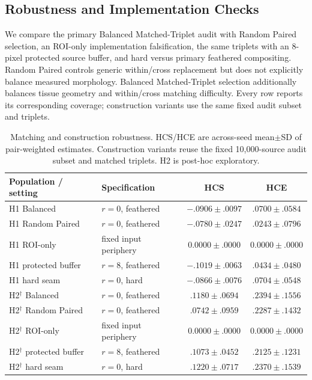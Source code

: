 \documentclass[notspecified,article,submit,moreauthors]{Definitions/mdpi}
\begin{document}
\subsection{Robustness and Implementation Checks}

We compare the primary Balanced Matched-Triplet audit with Random Paired
selection, an ROI-only implementation falsification, the same triplets with
an 8-pixel protected source buffer, and hard versus primary feathered
compositing. Random Paired controls generic within/cross replacement but
does not explicitly balance measured morphology. Balanced Matched-Triplet
selection additionally balances tissue geometry and within/cross matching
difficulty. Every row reports its corresponding coverage; construction
variants use the same fixed audit subset and triplets.

\begin{table}[H]
\caption{Matching and construction robustness. HCS/HCE are across-seed
mean$\pm$SD of pair-weighted estimates. Construction variants reuse the
fixed 10,000-source audit subset and matched triplets. H2 is post-hoc
exploratory.}
\label{tab:identification_summary}
\centering
\scriptsize
\setlength{\tabcolsep}{2.2pt}
\begin{tabularx}{\columnwidth}{@{}lXcc@{}}
\toprule
Population / setting & Specification & HCS & HCE \\
\midrule
H1 Balanced & $r=0$, feathered & $-.0906\pm.0097$ & $.0700\pm.0584$ \\
H1 Random Paired & $r=0$, feathered & $-.0780\pm.0247$ & $.0243\pm.0796$ \\
H1 ROI-only & fixed input periphery & $0.0000\pm.0000$ & $0.0000\pm.0000$ \\
H1 protected buffer & $r=8$, feathered & $-.1019\pm.0063$ & $.0434\pm.0480$ \\
H1 hard seam & $r=0$, hard & $-.0866\pm.0076$ & $.0704\pm.0548$ \\
\midrule
H2$^\dagger$ Balanced & $r=0$, feathered & $.1180\pm.0694$ & $.2394\pm.1556$ \\
H2$^\dagger$ Random Paired & $r=0$, feathered & $.0742\pm.0959$ & $.2287\pm.1432$ \\
H2$^\dagger$ ROI-only & fixed input periphery & $0.0000\pm.0000$ & $0.0000\pm.0000$ \\
H2$^\dagger$ protected buffer & $r=8$, feathered & $.1073\pm.0452$ & $.2125\pm.1231$ \\
H2$^\dagger$ hard seam & $r=0$, hard & $.1220\pm.0717$ & $.2370\pm.1539$ \\
\bottomrule
\end{tabularx}
\end{table}
\end{document}
